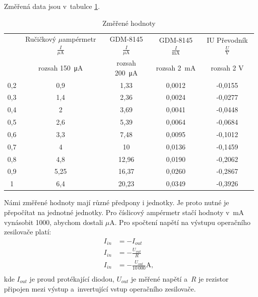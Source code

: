 \documentclass[a4paper,12pt]{article}   %
\newcommand{\tmu}{$\mu$}
\begin{document}
Změřená data jsou v~tabulce \ref{tab:zmereno}.
\begin{table}[h!]
    \centering
    \begin{tabular}{|c|c|c|c|c|}
        \hline
        \rule{0pt}{2.5ex}
        \multirow{2}{*}{Vstupní napětí $\frac{U}{\textrm{V}}$}& Ručičkový \tmu ampérmetr$\frac{I}{\mu\textrm{A}}$ 	&GDM-8145 $\frac{I}{\mu\textrm{A}}$	&GDM-8145 $\frac{I}{\textrm{mA}}$	&IU Převodník $\frac{U}{\textrm{V}}$  \\[.7ex]
        & rozsah  150~μA & rozsah 200~μA & rozsah  2~mA & rozsah  2 V\\\hline\hline
        0,2 &0,9    &1,33   &0,0012 &-0,0155     \\\hline
        0,3 &1,4    &2,36   &0,0024 &-0,0277     \\\hline
        0,4 &2      &3,69   &0,0041 &-0,0448       \\\hline
        0,5 &2,6    &5,39   &0,0064 &-0,0684     \\\hline
        0,6 &3,3    &7,48   &0,0095 &-0,1012     \\\hline
        0,7 &4      &10     &0,0136 &-0,1459         \\\hline
        0,8 &4,8    &12,96  &0,0190 &-0,2062    \\\hline
        0,9 &5,25   &16,37  &0,0260 &-0,2867   \\\hline
        1   &6,4    &20,23  &0,0349 &-0,3926      \\\hline
    
    \end{tabular}
    \caption{Změřené hodnoty}
    \label{tab:zmereno}
\end{table}

Námi změřené hodnoty mají různé předpony i jednotky. Je proto nutné je přepočítat na jednotné jednotky. Pro číslicový ampérmetr stačí hodnoty v~mA vynásobit 1000, abychom dostali \tmu A. Pro spočtení napětí na výstupu operačního zesilovače platí:
\begin{equation}
    \begin{split}
        I_{in}&=-I_{out}\\
        I_{in}&=-\frac{U_{out}}{R}\\
        I_{in}&=-\frac{U_{out}}{10\,000} \textrm{A},\\
    \end{split}
    \label{eq:iu}
\end{equation}
kde $I_{out}$ je proud protékající diodou, $U_{out}$ je měřené napětí a~$R$ je rezistor připojen mezi výstup a~invertující vstup operačního zesilovače.
\end{document}
